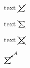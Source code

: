 \documentclass{article}
\begin{document}
text  $\cancel{\sum}$

text  $\bcancel{\sum}$

text  $\xcancel{\sum}$

$\cancelto{A}{\sum}$
\end{document}
